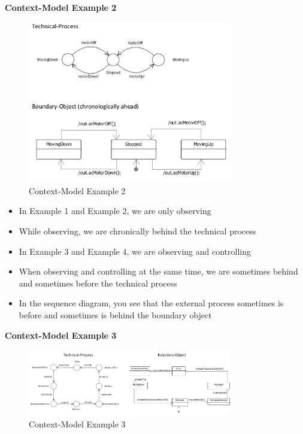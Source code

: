 \clearpage
\textbf{Context-Model Example 2}
\begin{figure}[H]
\centering
\includegraphics[width=0.8\textwidth]{figures/dynamicCorrespondence2.png}
\caption{Context-Model Example 2}
\end{figure}

\begin{itemize}
\tightlist
\item
  In Example 1 and Example 2, we are only observing
\item
  While observing, we are chronically behind the technical process
\item
  In Example 3 and Example 4, we are observing and controlling
\item
  When observing and controlling at the same time, we are sometimes
  behind and sometimes before the technical process
\item
  In the sequence diagram, you see that the external process sometimes
  is before and sometimes is behind the boundary object
\end{itemize}

\clearpage
\textbf{Context-Model Example 3}
\begin{figure}[H]
\centering
\includegraphics[width=0.8\textwidth]{figures/dynamicCorrespondence3.png}
\caption{Context-Model Example 3}
\end{figure}


